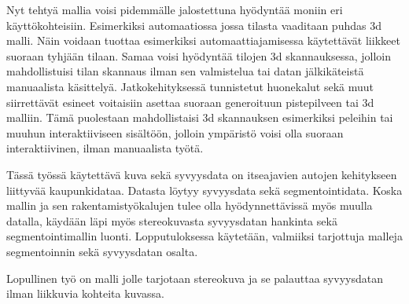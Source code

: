 Nyt tehtyä mallia voisi pidemmälle jalostettuna hyödyntää moniin eri käyttökohteisiin.
Esimerkiksi automaatiossa jossa tilasta vaaditaan puhdas 3d malli.
Näin voidaan tuottaa esimerkiksi automaattiajamisessa käytettävät liikkeet suoraan tyhjään tilaan.
Samaa voisi hyödyntää tilojen 3d skannauksessa,
jolloin mahdollistuisi tilan skannaus ilman sen valmistelua tai datan jälkikäteistä manuaalista käsittelyä. 
Jatkokehityksessä tunnistetut huonekalut sekä muut siirrettävät esineet voitaisiin asettaa suoraan generoituun pistepilveen tai 3d malliin.
Tämä puolestaan mahdollistaisi 3d skannauksen esimerkiksi peleihin tai muuhun interaktiiviseen sisältöön,
jolloin ympäristö voisi olla suoraan interaktiivinen, ilman manuaalista työtä. 

Tässä työssä käytettävä kuva sekä syvyysdata on itseajavien autojen kehitykseen liittyvää kaupunkidataa. 
Datasta löytyy syvyysdata sekä segmentointidata.
Koska mallin ja sen rakentamistyökalujen tulee olla hyödynnettävissä myös muulla datalla,
käydään läpi myös stereokuvasta syvyysdatan hankinta sekä segmentointimallin luonti.
Lopputuloksessa käytetään,
valmiiksi tarjottuja malleja segmentoinnin sekä syvyysdatan osalta.

Lopullinen työ on malli jolle tarjotaan stereokuva ja se palauttaa syvyysdatan ilman liikkuvia kohteita kuvassa.

